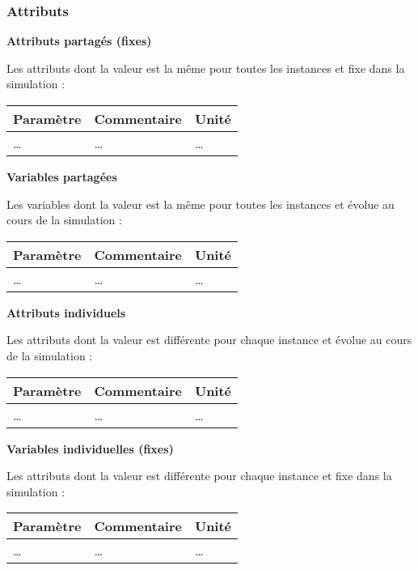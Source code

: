 \documentclass[
]{article}
\begin{document}
\subsubsection{Attributs}\label{attributs-14}

\textbf{Attributs partagés (fixes)}

Les attributs dont la valeur est la même pour toutes les instances et
fixe dans la simulation :

\begin{longtable}[]{@{}lll@{}}
\toprule\noalign{}
\textbf{Paramètre} & \textbf{Commentaire} & \textbf{Unité} \\
\midrule\noalign{}
\endhead
\bottomrule\noalign{}
\endlastfoot
\ldots{} & \ldots{} & \ldots{} \\
\end{longtable}

\textbf{Variables partagées}

Les variables dont la valeur est la même pour toutes les instances et
évolue au cours de la simulation :

\begin{longtable}[]{@{}lll@{}}
\toprule\noalign{}
\textbf{Paramètre} & \textbf{Commentaire} & \textbf{Unité} \\
\midrule\noalign{}
\endhead
\bottomrule\noalign{}
\endlastfoot
\ldots{} & \ldots{} & \ldots{} \\
\end{longtable}

\textbf{Attributs individuels}

Les attributs dont la valeur est différente pour chaque instance et
évolue au cours de la simulation :

\begin{longtable}[]{@{}lll@{}}
\toprule\noalign{}
\textbf{Paramètre} & \textbf{Commentaire} & \textbf{Unité} \\
\midrule\noalign{}
\endhead
\bottomrule\noalign{}
\endlastfoot
\ldots{} & \ldots{} & \ldots{} \\
\end{longtable}

\textbf{Variables individuelles (fixes)}

Les attributs dont la valeur est différente pour chaque instance et fixe
dans la simulation :

\begin{longtable}[]{@{}lll@{}}
\toprule\noalign{}
\textbf{Paramètre} & \textbf{Commentaire} & \textbf{Unité} \\
\midrule\noalign{}
\endhead
\bottomrule\noalign{}
\endlastfoot
\ldots{} & \ldots{} & \ldots{} \\
\end{longtable}
\end{document}
